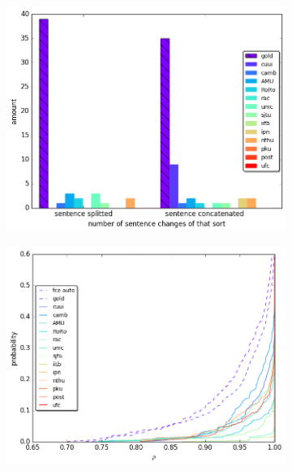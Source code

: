 \documentclass[letter,11pt]{article}
\begin{document}
\begin{figure}[tbp]
  \centering
  \begin{subfigure}[]{0.4\textwidth}
    \label{fig:split}
    \includegraphics[width = \textwidth]{aligned}
    \caption{}
  \end{subfigure}
  \vspace{1cm}
  \begin{subfigure}[]{0.4\textwidth}
      \label{fig:rho}
      \includegraphics[width = \textwidth]{spearman_ecdf}
  \end{subfigure}
  \vspace{1cm}
  \begin{subfigure}[]{0.4\textwidth}

\end{subfigure}
\end{figure}
\end{document}
